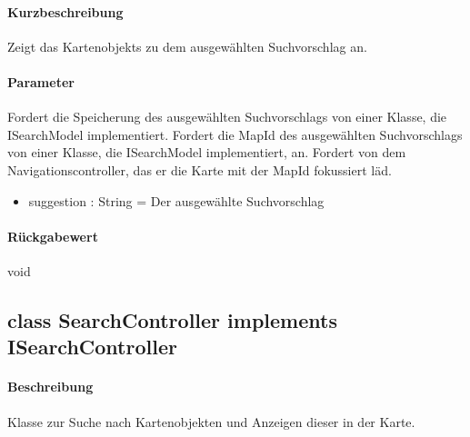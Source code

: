 \paragraph*{Kurzbeschreibung}
Zeigt das Kartenobjekts zu dem ausgewählten Suchvorschlag an.
\paragraph*{Parameter}
Fordert die Speicherung des ausgewählten Suchvorschlags von einer Klasse, die ISearchModel implementiert.
Fordert die MapId des ausgewählten Suchvorschlags von einer Klasse, die ISearchModel implementiert, an.
Fordert von dem Navigationscontroller, das er die Karte mit der MapId fokussiert läd.
\begin{itemize}
    \item suggestion : String = Der ausgewählte Suchvorschlag
\end{itemize}
\paragraph*{Rückgabewert}
void

\subsection{class SearchController implements ISearchController}
\paragraph*{Beschreibung}
Klasse zur Suche nach Kartenobjekten und Anzeigen dieser in der Karte.